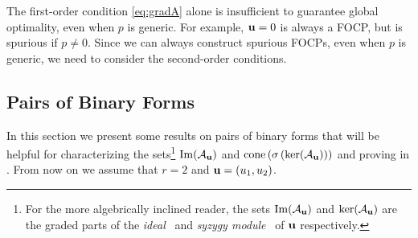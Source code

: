 \documentclass[final,onefignum,onetabnum]{siamart220329}
\begin{document}
\begin{remark} \label{remark:socp-necessary} The first-order condition
  \eqref{eq:gradA} alone is insufficient to guarantee global optimality, even
  when $p$ is generic. For example, $\boldsymbol{\mathbf{u}} = 0$ is always a FOCP, but is
  spurious if $p \ne 0$. Since we can always construct spurious FOCPs, even when
  $p$ is generic, we need to consider the second-order conditions.
\end{remark}

\subsection{Pairs of Binary Forms}
\label{sec:binary-forms}
In this section we present some results on pairs of binary forms that will be
helpful for characterizing the sets\footnote{For the more algebrically inclined
  reader, the sets $\operatorname{Im}(\mathcal{A}_{\boldsymbol{\mathbf{u}}})$ and $\ker(\mathcal{A}_{\boldsymbol{\mathbf{u}}})$ are the graded parts of
  the \emph{ideal}~\cite[Definition~1.4.1]{cox2015groebner} and \emph{syzygy
    module}~\cite[Definition~10.4.3]{cox2015groebner} of $\boldsymbol{\mathbf{u}}$ respectively.}
$\operatorname{Im}(\mathcal{A}_{\boldsymbol{\mathbf{u}}})$ and $\operatorname{cone}\left( \sigma\left( \ker(\mathcal{A}_{\boldsymbol{\mathbf{u}}}) \right) \right)$ and proving
 in . From now on we assume that $r=2$ and
$\boldsymbol{\mathbf{u}} = (u_1, u_2)$.
\end{document}
